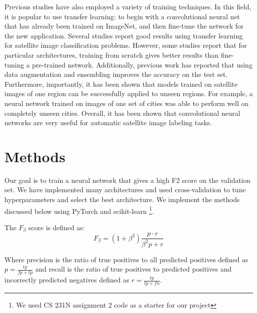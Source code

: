 \documentclass[10pt,twocolumn,letterpaper]{article}
\begin{document}
Previous studies have also employed a variety of training techniques. In this field, it is popular to use transfer learning: to begin with a convolutional neural net that has already been trained on ImageNet,\cite{imagenet} and then fine-tune the network for the new application. Several studies report good results using transfer learning for satellite image classification problems. \cite{TransferLearning2} \cite{TransferLearning3} \cite{TransferLearning5} \cite{TransferLearning1} \cite{TransferLearning4} However, some studies report that for particular architectures, training from scratch gives better results than fine-tuning a pre-trained network.\cite{fromscratch2} Additionally, previous work has reported that using data augmentation and ensembling improves the accuracy on the test set. \cite{TransferLearning4} \cite{Ensemble1} Furthermore, importantly, it has been shown that models trained on satellite images of one region can be successfully applied to unseen regions.\cite{PovertyMapping} For example, a neural network trained on images of one set of cities was able to perform well on completely unseen cities. \cite{TransferLearning5} Overall, it has been shown that convolutional neural networks are very useful for automatic satellite image labeling tasks.



\section{Methods}
Our goal is to train a neural network that gives a high F2 score on the validation set. We have implemented many architectures and used cross-validation to tune hyperparameters and select the best architecture. We implement the methods discussed below using PyTorch \cite{PyTorch} and scikit-learn \cite{scikit-learn} \footnote{We used CS 231N assignment 2 code as a starter for our project}.

The $F_{\beta}$ score is defined as:
\begin{equation} \label{eq:F2_score}
F_{\beta} = (1+\beta^2) \frac{p \cdot r}{\beta^2p + r}
\end{equation}

Where precision is the ratio of true positives to all predicted positives defined as $p = \frac{tp}{fp + tp}$ and recall is the ratio of true positives to predicted positives and incorrectly predicted negatives defined as $r = \frac{tp}{tp + fn}$.
\end{document}
